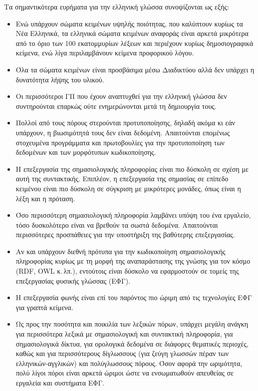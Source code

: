 \documentclass[]{../../metanetpaper}
\begin{document}
\begin{multicols}{2}
Τα σημαντικότερα ευρήματα για την ελληνική γλώσσα συνοψίζονται ως εξής:

\begin{itemize}
\item Ενώ υπάρχουν σώματα κειμένων υψηλής ποιότητας, που καλύπτουν κυρίως τα Νέα Ελληνικά, τα ελληνικά σώματα κειμένων αναφοράς είναι αρκετά μικρότερα από το όριο των 100 εκατομμυρίων λέξεων και περιέχουν κυρίως δημοσιογραφικά κείμενα, ενώ λίγα περιλαμβάνουν κείμενα προφορικού λόγου.
\item Όλα τα σώματα κειμένων είναι προσβάσιμα μέσω Διαδικτύου αλλά δεν υπάρχει η δυνατότητα λήψης του υλικού.
\item Οι περισσότεροι ΓΠ που έχουν αναπτυχθεί για την ελληνική γλώσσα δεν συντηρούνται επαρκώς ούτε ενημερώνονται μετά τη δημιουργία τους.
\item Πολλοί από τους πόρους στερούνται προτυποποίησης, δηλαδή ακόμα κι εάν υπάρχουν, η βιωσιμότητά τους δεν είναι δεδομένη. Απαιτούνται επομένως στοχευμένα προγράμματα και πρωτοβουλίες για την προτυποποίηση των δεδομένων και των μορφότυπων κωδικοποίησης.
\item Η επεξεργασία της σημασιολογικής πληροφορίας είναι πιο δύσκολη σε σχέση με αυτή της συντακτικής. Επιπλέον, η επεξεργασία της σημασίας σε επίπεδο κειμένου είναι πιο δύσκολη σε σύγκριση με μικρότερες μονάδες, όπως είναι η λέξη και η πρόταση.
\item Όσο περισσότερη σημασιολογική πληροφορία λαμβάνει υπόψη του ένα εργαλείο, τόσο δυσκολότερο είναι να βρεθούν τα σωστά δεδομένα. Απαιτούνται περισσότερες προσπάθειες για την υποστήριξη της βαθύτερης επεξεργασίας.
\item Αν και υπάρχουν διεθνή πρότυπα για την κωδικοποίηση σημασιολογικής πληροφορίας  κυρίως με τη μορφή της αναπαράστασης της γνώσης για τον κόσμο (RDF, OWL κ.\,λπ.), εντούτοις είναι δύσκολο να εφαρμοστούν σε τομείς της επεξεργασίας φυσικής γλώσσας (ΕΦΓ).
\item Η επεξεργασία φωνής είναι επί του παρόντος πιο ώριμη από τις τεχνολογίες ΕΦΓ για γραπτά κείμενα.
\item Ως προς την ποσότητα και ποικιλία των λεξικών πόρων, υπάρχει μεγάλη ανάγκη για περισσότερα λεξικά με σημασιολογική και συντακτική πληροφορία, για σημασιολογικά δίκτυα,  για ορολογικά δεδομένα σε διάφορες θεματικές περιοχές, καθώς και για περισσότερους δίγλωσσους (για ζεύγη γλωσσών πέραν των ελληνικών-αγγλικών) και πολύγλωσσους πόρους. Όσον αφορά την ωριμότητα, πολύ λίγοι πόροι είναι αρκετά ώριμοι ώστε να ενσωματωθούν απευθείας σε εργαλεία και συστήματα ΕΦΓ.

\end{itemize}
\end{multicols}
\end{document}
